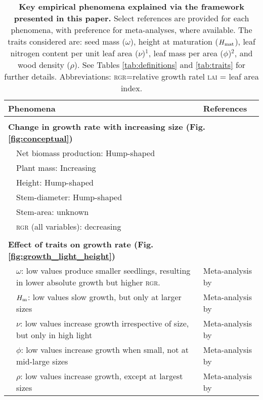 \documentclass[a4paper,11pt]{article}
\begin{document}
\begin{table}[ht]
\caption{\textbf{Key empirical phenomena explained via the framework presented in this paper.}
Select references are provided for each phenomena, with preference for meta-analyses, where available. The traits considered are: seed mass ($\omega$), height at maturation ($H_{{\rm mat}}$), leaf nitrogen content per unit leaf area ($\nu$)$^1$, leaf mass per area ($\phi$)$^2$, and wood density ($\rho$). See Tables \ref{tab:definitions} and \ref{tab:traits} for further details. Abbreviations: \textsc{rgr}=relative growth ratel \textsc{lai} = leaf area index.
}
{\footnotesize
{\centering
  \begin{tabular}{p{0.1cm}p{9cm}p{6cm}}
  \\
  \hline
  \multicolumn{2}{l}{ Phenomena} & References \\
  \hline
  \\
  \multicolumn{3}{l}{\bf{Change in growth rate with increasing size} (Fig. \ref{fig:conceptual})}\\
  & Net biomass production: Hump-shaped & \citet{Givnish-1988, Koch-2004} \\
  & Plant mass: Increasing & \citet{Sillett-2010, Stephenson-2014} \\
  & Height: Hump-shaped &  \citet{Ryan-2006, Sillett-2010, King-2011} \\
  & Stem-diameter: Hump-shaped &  \citet{Herault-2011} \\
  & Stem-area: unknown & \\
  & \textsc{rgr} (all variables): decreasing & \citet{Rees-2010, Iida-2014}\\
  \\
  \multicolumn{3}{l}{\bf{Effect of traits on growth rate} (Fig. \ref{fig:growth_light_height})}\\
  & $\omega$: low values produce smaller seedlings, resulting in lower absolute growth but higher \textsc{rgr}. & Meta-analysis by \citet{Gibert-2016} \\
  & $H_{\rm m}$: low values slow growth, but only at larger sizes & Meta-analysis by \citet{Gibert-2016}\\
  & $\nu$: low values increase growth irrespective of size, but only in high light & Meta-analysis by \citet{Gibert-2016}\\
  & $\phi$: low values increase growth when small, not at mid-large sizes & Meta-analysis by \citet{Gibert-2016}\\
  & $\rho$: low values increase growth, except at largest sizes & Meta-analysis by \citet{Gibert-2016}\\


\end{tabular}}}
\end{table}
\end{document}
